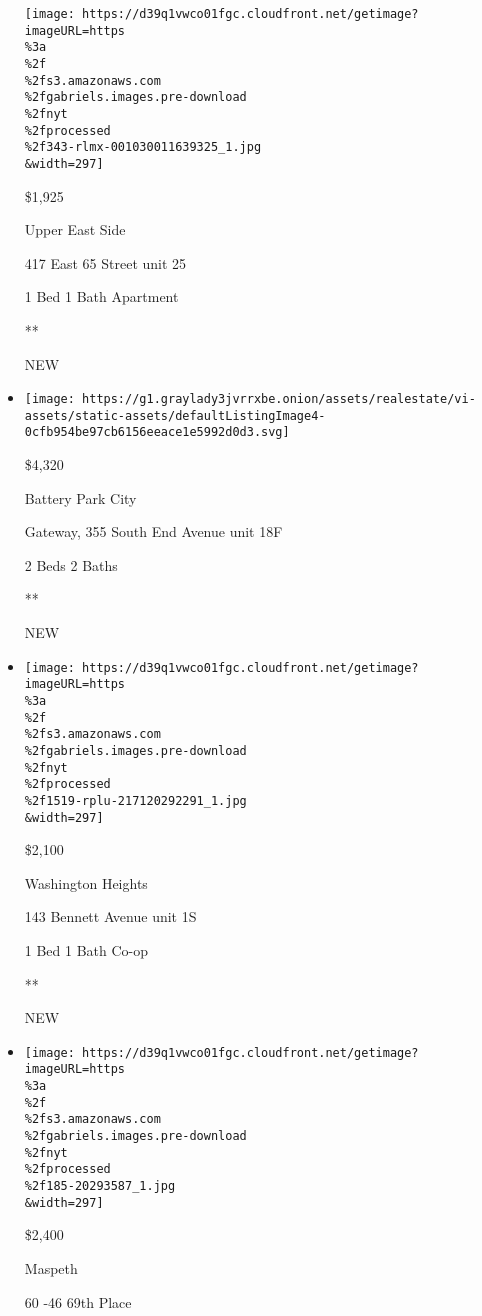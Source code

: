 \begin{itemize}
  \texttt{[image: https://d39q1vwco01fgc.cloudfront.net/getimage?imageURL=https\\\%3a\\\%2f\\\%2fs3.amazonaws.com\\\%2fgabriels.images.pre-download\\\%2fnyt\\\%2fprocessed\\\%2f343-rlmx-001030011639325\_1.jpg\\\&width=297]}

  \$1,925

  Upper East Side

  417 East 65 Street unit 25

  1 Bed \textbar{} 1 Bath \textbar{} Apartment

  **

  NEW
\item
  \href{/real-estate/usa/ny/new-york/battery-park-city/homes-for-rent/gateway-355-south-end-avenue/46-4337084?}{}

  \texttt{[image: https://g1.graylady3jvrrxbe.onion/assets/realestate/vi-assets/static-assets/defaultListingImage4-0cfb954be97cb6156eeace1e5992d0d3.svg]}

  \$4,320

  Battery Park City

  Gateway, 355 South End Avenue unit 18F

  2 Beds \textbar{} 2 Baths \textbar{}

  **

  NEW
\item
  \href{/real-estate/usa/ny/new-york/washington-heights/homes-for-rent/143-bennett-avenue/1519-RPLU-217120292291?}{}

  \texttt{[image: https://d39q1vwco01fgc.cloudfront.net/getimage?imageURL=https\\\%3a\\\%2f\\\%2fs3.amazonaws.com\\\%2fgabriels.images.pre-download\\\%2fnyt\\\%2fprocessed\\\%2f1519-rplu-217120292291\_1.jpg\\\&width=297]}

  \$2,100

  Washington Heights

  143 Bennett Avenue unit 1S

  1 Bed \textbar{} 1 Bath \textbar{} Co-op

  **

  NEW
\item
  \href{/real-estate/usa/ny/queens/maspeth/homes-for-rent/60--46-69th-place/185-20293587?}{}

  \texttt{[image: https://d39q1vwco01fgc.cloudfront.net/getimage?imageURL=https\\\%3a\\\%2f\\\%2fs3.amazonaws.com\\\%2fgabriels.images.pre-download\\\%2fnyt\\\%2fprocessed\\\%2f185-20293587\_1.jpg\\\&width=297]}

  \$2,400

  Maspeth

  60 -46 69th Place


\end{itemize}
